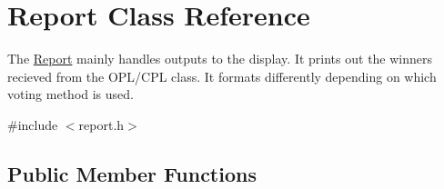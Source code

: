\hypertarget{classReport}{}\section{Report Class Reference}
\label{classReport}


The \hyperlink{classReport}{Report} mainly handles outputs to the display. It prints out the winners recieved from the O\+P\+L/\+C\+PL class. It formats differently depending on which voting method is used.  




{\ttfamily \#include $<$report.\+h$>$}

\subsection*{Public Member Functions}
